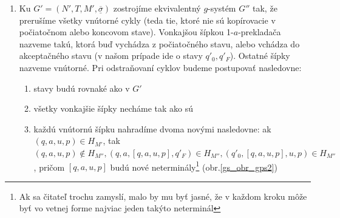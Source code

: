 \begin{dokaz}
\begin{enumerate}
\begin{enumerate}
      Na to, aby sme mali $L(G)=L(G')$ ešte potrebujeme v istom kroku
      odznačiť prvý aj posledný označený symbol. Avšak keďže máme v
      1-$a$-prekladači $g$-systému $G'$ šípky z $q'_0$ do iného stavu,
      resp. šípky do $q'_F$ z iného stavu (teda nie kopírovacie cykly v
      týchto stavoch) iba na označený symbol, tak s odznačenou vetnou
      formou už ďalej nepohneme. Z toho plynie, že symboly možno
      odznačiť len v poslednom kroku odvodenia, teda vtedy, ak všetky
      symboly vetnej formy, okrem prvého a posledného, sú terminály a aj
      prvý a posledný symbol (odhliadnuc od označenia) sú terminály.
      Teda opäť nedeterministicky hádame posledný krok. Formálne
      definujme:
      \[
      H_T=\{(q'_0,\overline{a},a,q_T),(q_T,a,a,q_T),
      (q_T,\underline{a},a,q'_F)\mm a\in T\}
      \]
      $q_T$ je nový stav 1-$a$-prekladača $g$-systému $G'$. Zachovali
      sme konzistentnosť v tom zmysle, že z $q'_0$ vychádzajú, okrem
      kopírovacích cyklov, iba šípky na prvý (nad\-čiar\-knu\-tý) symbol
      a do $q'_F$ vchádzajú, okrem kopírovacích cyklov, iba šípky na
      posledný\linebreak (pod\-čiar\-knu\-tý) symbol vetnej formy, teda máme
      $L(G)=L(G')$, pričom\newline $G'=(N',T,M',\underline{\overline{\sigma}})$.
      Čo sa týka $M'$ pre nás je zaujímavé, ako sa zmenila prechodová
      množina: keď v $M$ to bola $H$, tak v $M'$ to bude
      $H_{M'}=H'\cup\overline{H}\cup\underline{H}\cup H_T$. Pokiaľ ide o
      stavy a abecedy, ich konštrukcia by mala byť z už uvedeného
      zrejmá.
    \end{enumerate}
    \item Ku $G'=(N',T,M',\underline{\overline{\sigma}})$
    zostrojíme ekvivalentný $g$-systém $G''$ tak, že prerušíme všetky vnútorné cykly
    (teda tie, ktoré nie sú kopírovacie v počiatočnom alebo koncovom
    stave). Vonkajšou šípkou 1-$a$-prekladača nazveme takú, ktorá buď
    vychádza z počiatočného stavu, alebo vchádza do akceptačného stavu
    (v našom prípade ide o stavy $q'_0,q'_F$). Ostatné šípky nazveme
    vnútorné. Pri odstraňovaní cyklov budeme postupovať nasledovne:
    \begin{enumerate}
      \item stavy budú rovnaké ako v $G'$
      \item všetky vonkajšie šípky necháme tak ako sú
      \item každú vnútornú šípku nahradíme dvoma novými nasledovne: ak
      $(q,a,u,p)\in H_{M'}$, tak $(q,a,u,p)\not\in H_{M''},
      (q,a,[q,a,u,p],q'_{F})\in H_{M''}, (q'_0,[q,a,u,p],u,p)\in
      H_{M''}$, pričom $[q,a,u,p]$ budú nové neterminály\footnote{Ak sa
      čitateľ trochu zamyslí, malo by mu byť jasné, že v každom kroku
      môže byť vo vetnej forme najviac jeden takýto neterminál}
      (obr.\ref{gs_obr_gps2})
    \end{enumerate}


\end{enumerate}
\end{dokaz}
